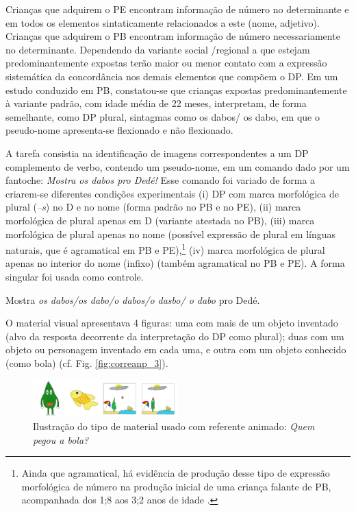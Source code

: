 \documentclass[output=paper]{LSP/langsci}
\begin{document}
Crianças que adquirem o PE encontram informação de número no determinante e em todos os elementos sintaticamente relacionados a este (nome, adjetivo). Crianças que adquirem o PB encontram informação de número necessariamente no determinante. Dependendo da variante social /regional a que estejam predominantemente expostas terão maior ou menor contato com a expressão sistemática da concordância nos demais elementos que compõem o DP. Em um estudo conduzido em PB, constatou-se que crianças expostas predominantemente à variante padrão, com idade média de 22 meses, interpretam, de forma semelhante, como DP plural, sintagmas como os dabos/ os dabo, em que o pseudo-nome apresenta-se flexionado e não flexionado.

A tarefa consistia na identificação de imagens correspondentes a um DP complemento de verbo, contendo um pseudo-nome, em um comando dado por um fantoche: \textit{Mostra os dabos pro Dedé!}  Esse comando foi variado de forma a criarem-se diferentes condições experimentais (i) DP com marca morfológica de plural (\textit{–s}) no D e no nome (forma padrão no PB e no PE), (ii) marca morfológica de plural apenas em D (variante atestada no PB), (iii) marca morfológica de plural apenas no nome (possível expressão de plural em línguas naturais, que é agramatical em PB e PE),\footnote{Ainda que agramatical, há evidência de produção desse tipo de expressão morfológica de número na produção inicial de uma criança falante de PB, acompanhada dos 1;8 aos 3;2 anos de idade \citep{lopes2004,simioni2006}.} (iv) marca morfológica de plural apenas no interior do nome (infixo) (também agramatical no PB e PE). A forma singular foi usada como controle.

\ea\label{ex:correanp_19} Mostra \textit{os dabos/os dabo/o dabos/o dasbo/ o dabo} pro Dedé.
\z

O material visual apresentava 4 figuras: uma com mais de um objeto inventado (alvo da resposta decorrente da interpretação do DP como plural); duas com um objeto ou personagem inventado em cada uma, e outra com um objeto conhecido (como bola) (cf. Fig. \ref{fig:correanp_3}).

\begin{figure}
\includegraphics[width=0.5\textwidth]{figures/correanp2}
\caption{Ilustração do tipo de material usado com referente animado: \textit{Quem pegou a bola?}}
\label{fig:correanp_2}
\end{figure}
\end{document}

